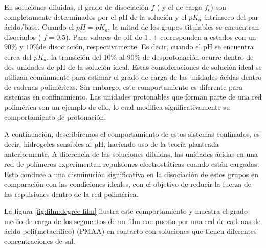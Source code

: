 En soluciones diluidas, el grado de disociaci\'on $f$ ( y el de carga $f_c$) son completamente determinados por el pH de la soluci\'on y el $pK_a$ intr\'inseco del par \'acido/base. Cuando el $pH = pK_a$, la mitad de los grupos titulables se encuentran disociados ( $f = 0.5$).  Para valores de pH de $1 \, ,\pm$ corresponden a estados con un $90\%$ y $10\%$de disociaci\'on, respectivamente. Es decir, cuando el pH se encuentra cerca del $pK_a$, la transici\'on del $10\%$ al $90\%$ de desprotonaci\'on ocurre dentro de dos unidades de pH de la soluci\'on ideal.
Estas consideraciones de soluci\'on ideal se utilizan com\'unmente para estimar el grado de carga de las unidades \'acidas dentro de cadenas polim\'ericas. Sin embargo, este comportamiento es diferente para sistemas en confinamiento. Las unidades protonables que forman parte de una red polim\'erica son un ejemplo de ello, lo cual modifica significativamente su comportamiento de protonaci\'on.


A continuaci\'on, describiremos el comportamiento de estos sistemas confinados, es decir, hidrogeles sensibles al pH, haciendo uso de la teor\'ia planteada anteriormente.
A diferencia de las soluciones diluidas, las unidades \'acidas en una red de pol\'imeros experimentan repulsiones electrost\'aticas cuando est\'an cargadas. Esto conduce a una disminuci\'on significativa en la disociaci\'on de estos grupos en comparaci\'on con las condiciones ideales, con el objetivo de reducir la fuerza de las repulsiones dentro de la red polim\'erica.

La figura \ref{fig:film:degree-film} ilustra este comportamiento y muestra el grado medio de carga de los segmentos de un film compuesto por una red de cadenas de \'acido poli(metacrílico) (PMAA) en contacto con soluciones que tienen diferentes concentraciones de sal.



